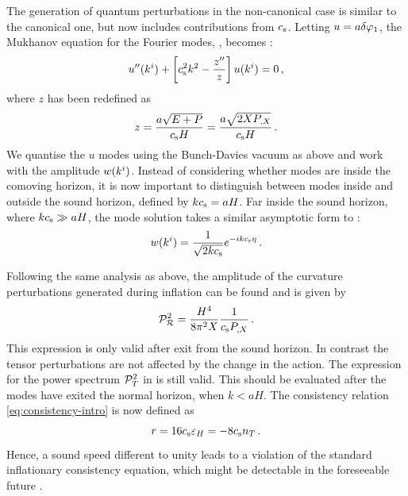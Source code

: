 The generation of quantum perturbations in the non-canonical case is similar to
the canonical one, but now includes contributions from $c_\mathrm{s}$. Letting
$u=a\delta\varphi_{1}$, the Mukhanov equation for the
Fourier modes, , becomes
\cite{gm}:
% 
\begin{equation}
 u''(k^i) + \left[c_\mathrm{s}^2 k^2 - \frac{z''}{z}\right] u(k^i) = 0\,,
\end{equation}
% 
where $z$ has been redefined as
% 
\begin{equation}
 z = \frac{a\sqrt{E+P}}{c_\mathrm{s} H} = \frac{a\sqrt{2XP_{,X}}}{c_\mathrm{s} H} \,.
\end{equation}
% 
We quantise the $u$ modes using the Bunch-Davies vacuum as above and work with the
amplitude $w(k^i)$. Instead of considering whether modes are
inside the comoving horizon, it is now important to distinguish between modes
inside and outside the sound horizon, defined by $kc_\mathrm{s} = aH$. Far inside the sound
horizon, where $kc_\mathrm{s} \gg aH$, the mode solution takes a similar asymptotic form to
:
% 
\begin{equation}
 w(k^i) = \frac{1}{\sqrt{2kc_\mathrm{s}}} e^{-ikc_\mathrm{s} \eta}\,.
\end{equation}


Following the same analysis as above, the amplitude of the curvature 
perturbations 
generated during inflation can be found and is given by
\cite{gm}
% 
\begin{equation} 
\label{eq:Ps-dbiintro}
 \mathcal{P}_{\mathcal{R}}^2  = \frac{H^4}{8\pi^2 X}\frac{1}{c_\mathrm{s} P_{,X}} \,.
\end{equation}
% 
This expression is only valid after exit from the sound horizon. In contrast
the tensor perturbations are not affected by the change in the action. The
expression for the power spectrum $\mathcal{P}_T^2$ in  is still valid.
This should be evaluated after the modes have exited the normal horizon,
\iec when $k < aH$. 
The consistency relation \eqref{eq:consistency-intro} is now defined as
\cite{gm} 
% 
\begin{equation}
\label{eq:rdefn-dbiintro}
  r = 16c_\mathrm{s} \varepsilon_H = -8c_\mathrm{s} n_T \,.
\end{equation}
% 
Hence, a sound speed different to unity leads to a violation of the 
standard inflationary consistency equation, which might be 
detectable in the foreseeable future \cite{lidser1,lidser2}. 




